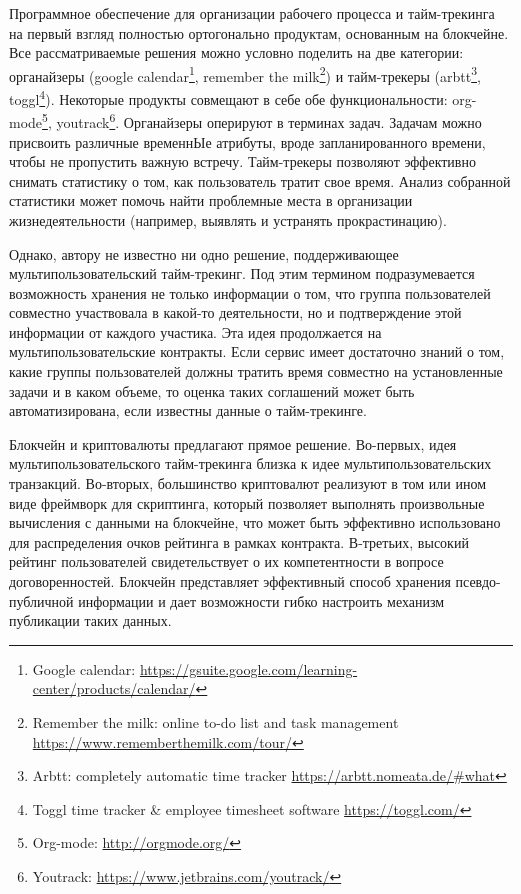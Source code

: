 \documentclass[]{itmo-student-thesis}
\begin{document}
Программное обеспечение для организации рабочего процесса и
тайм-трекинга на первый взгляд полностью ортогонально продуктам,
основанным на блокчейне. Все рассматриваемые решения можно условно
поделить на две категории: органайзеры (google
calendar\footnote{Google calendar:
  \url{https://gsuite.google.com/learning-center/products/calendar/}},
remember the milk\footnote{Remember the milk: online to-do list and
  task management \url{https://www.rememberthemilk.com/tour/}}) и
тайм-трекеры (arbtt\footnote{Arbtt: completely automatic time tracker
  \url{https://arbtt.nomeata.de/#what}}, toggl\footnote{Toggl time
  tracker \& employee timesheet software
  \url{https://toggl.com/}}). Некоторые продукты совмещают в себе обе
функциональности: org-mode\footnote{Org-mode:
  \url{http://orgmode.org/}}, youtrack\footnote{ Youtrack:
  \url{https://www.jetbrains.com/youtrack/}}. Органайзеры оперируют в
терминах задач. Задачам можно присвоить различные временнЫе атрибуты,
вроде запланированного времени, чтобы не пропустить важную
встречу. Тайм-трекеры позволяют эффективно снимать статистику о том,
как пользователь тратит свое время. Анализ собранной статистики может
помочь найти проблемные места в организации жизнедеятельности
(например, выявлять и устранять прокрастинацию).

Однако, автору не известно ни одно решение, поддерживающее
мультипользовательский тайм-трекинг. Под этим термином подразумевается
возможность хранения не только информации о том, что группа
пользователей совместно участвовала в какой-то деятельности, но и
подтверждение этой информации от каждого участика. Эта идея
продолжается на мультипользовательские контракты. Если сервис имеет
достаточно знаний о том, какие группы пользователей должны тратить
время совместно на установленные задачи и в каком объеме, то оценка
таких соглашений может быть автоматизирована, если известны данные о
тайм-трекинге.

Блокчейн и криптовалюты предлагают прямое решение. Во-первых, идея
мультипользовательского тайм-трекинга близка к идее
мультипользовательских транзакций. Во-вторых, большинство криптовалют
реализуют в том или ином виде фреймворк для скриптинга, который
позволяет выполнять произвольные вычисления с данными на блокчейне,
что может быть эффективно использовано для распределения очков
рейтинга в рамках контракта. В-третьих, высокий рейтинг пользователей
свидетельствует о их компетентности в вопросе
договоренностей. Блокчейн представляет эффективный способ хранения
псевдо-публичной информации и дает возможности гибко настроить
механизм публикации таких данных.
\end{document}

